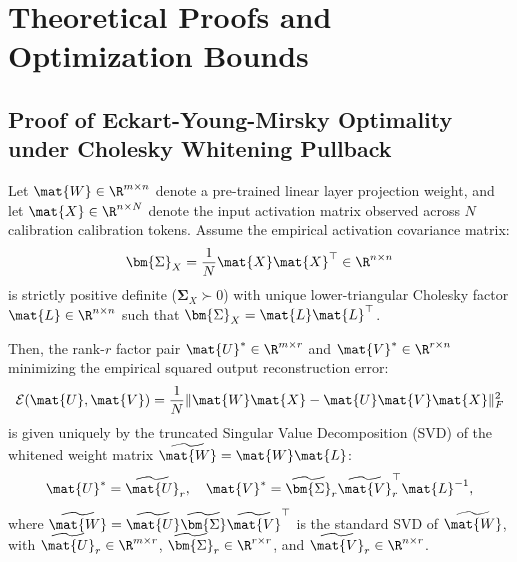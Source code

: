 \section{Theoretical Proofs and Optimization Bounds}
\label{sec:appendix_proofs}

\subsection{Proof of Eckart-Young-Mirsky Optimality under Cholesky Whitening Pullback}
\label{sec:proof_whitening}

\begin{theorem}
Let $\mat{W} \in \R^{m \times n}$ denote a pre-trained linear layer projection weight, and let $\mat{X} \in \R^{n \times N}$ denote the input activation matrix observed across $N$ calibration calibration tokens. Assume the empirical activation covariance matrix:
\begin{equation}
\bm{\Sigma}_X = \frac{1}{N} \mat{X} \mat{X}^\top \in \R^{n \times n}
\end{equation}
is strictly positive definite ($\bm{\Sigma}_X \succ 0$) with unique lower-triangular Cholesky factor $\mat{L} \in \R^{n \times n}$ such that $\bm{\Sigma}_X = \mat{L} \mat{L}^\top$. 

Then, the rank-$r$ factor pair $\mat{U}^* \in \R^{m \times r}$ and $\mat{V}^* \in \R^{r \times n}$ minimizing the empirical squared output reconstruction error:
\begin{equation}
\mathcal{E}(\mat{U}, \mat{V}) = \frac{1}{N} \|\mat{W}\mat{X} - \mat{U}\mat{V}\mat{X}\|_F^2
\label{eq:whitened_obj}
\end{equation}
is given uniquely by the truncated Singular Value Decomposition (SVD) of the whitened weight matrix $\widetilde{\mat{W}} = \mat{W} \mat{L}$:
\begin{equation}
\mat{U}^* = \widetilde{\mat{U}}_r, \quad \mat{V}^* = \widetilde{\bm{\Sigma}}_r \widetilde{\mat{V}}_r^\top \mat{L}^{-1},
\end{equation}
where $\widetilde{\mat{W}} = \widetilde{\mat{U}} \widetilde{\bm{\Sigma}} \widetilde{\mat{V}}^\top$ is the standard SVD of $\widetilde{\mat{W}}$, with $\widetilde{\mat{U}}_r \in \R^{m \times r}$, $\widetilde{\bm{\Sigma}}_r \in \R^{r \times r}$, and $\widetilde{\mat{V}}_r \in \R^{n \times r}$.
\end{theorem}

